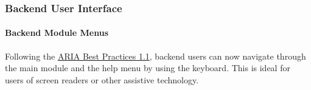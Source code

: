%

\begin{frame}[fragile]
	\frametitle{Backend User Interface}
	\framesubtitle{Backend Module Menus}

	Following the
	\href{https://www.w3.org/TR/wai-aria-practices-1.1/}{ARIA Best Practices 1.1},
	backend users can now navigate through the main module and the help menu by
	using the keyboard. This is ideal for users of screen readers or other
	assistive technology.


\end{frame}

